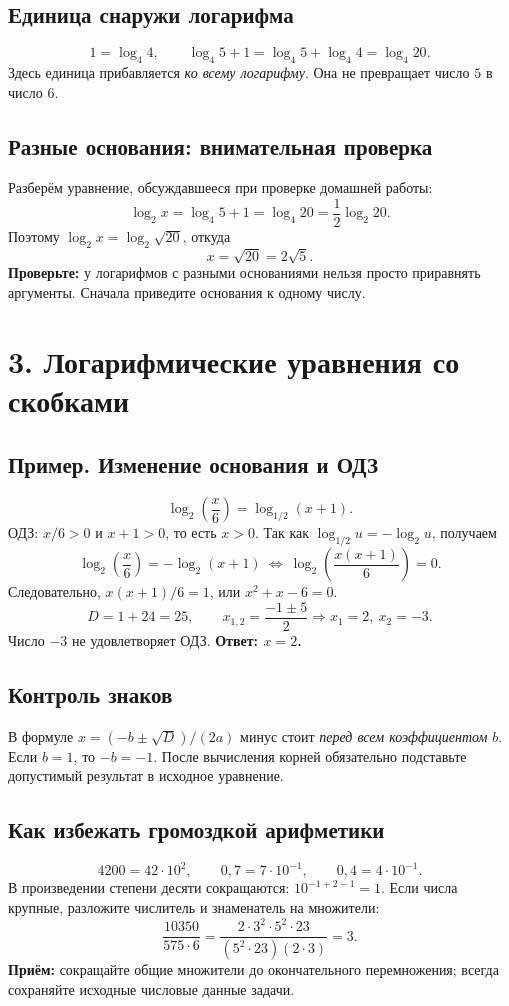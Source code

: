 \documentclass[a4paper,12pt]{article}
\newcommand{\key}[1]{\textcolor{darkaccent}{\textbf{#1}}}
\begin{document}
\subsection*{Единица снаружи логарифма}
\[
1=\log_4 4,\qquad \log_4 5+1=\log_4 5+\log_4 4=\log_4 20.
\]
Здесь единица прибавляется \emph{ко всему логарифму}. Она не превращает число $5$ в число $6$.
\subsection*{Разные основания: внимательная проверка}
Разберём уравнение, обсуждавшееся при проверке домашней работы:
\[
\log_2 x=\log_4 5+1=\log_4 20=\frac12\log_2 20.
\]
Поэтому $\log_2 x=\log_2\sqrt{20}$, откуда
\[\boxed{x=\sqrt{20}=2\sqrt5}.\]
\key{Проверьте:} у логарифмов с разными основаниями нельзя просто приравнять аргументы. Сначала приведите основания к одному числу.
\section*{3. Логарифмические уравнения со скобками}
\subsection*{Пример. Изменение основания и ОДЗ}
\[
\log_2\!\left(\frac{x}{6}\right)=\log_{1/2}(x+1).
\]
ОДЗ: $x/6>0$ и $x+1>0$, то есть $x>0$. Так как $\log_{1/2}u=-\log_2u$, получаем
\[
\log_2\!\left(\frac{x}{6}\right)=-\log_2(x+1)
\ \Longleftrightarrow\ \log_2\!\left(\frac{x(x+1)}{6}\right)=0.
\]
Следовательно, $x(x+1)/6=1$, или $x^2+x-6=0$.
\[
D=1+24=25,\qquad x_{1,2}=\frac{-1\pm5}{2} \Rightarrow x_1=2,\ x_2=-3.
\]
Число $-3$ не удовлетворяет ОДЗ. \key{Ответ: $x=2$.}
\subsection*{Контроль знаков}
В формуле $x=(-b\pm\sqrt D)/(2a)$ минус стоит \emph{перед всем коэффициентом} $b$. Если $b=1$, то $-b=-1$. После вычисления корней обязательно подставьте допустимый результат в исходное уравнение.
\subsection*{Как избежать громоздкой арифметики}
\[
4200=42\cdot10^2,\qquad 0{,}7=7\cdot10^{-1},\qquad
0{,}4=4\cdot10^{-1}.
\]
В произведении степени десяти сокращаются: $10^{-1+2-1}=1$. Если числа крупные, разложите числитель и знаменатель на множители:
\[
\frac{10350}{575\cdot6}
=\frac{2\cdot3^2\cdot5^2\cdot23}{(5^2\cdot23)(2\cdot3)}=3.
\]
\key{Приём:} сокращайте общие множители до окончательного перемножения; всегда сохраняйте исходные числовые данные задачи.
\end{document}
